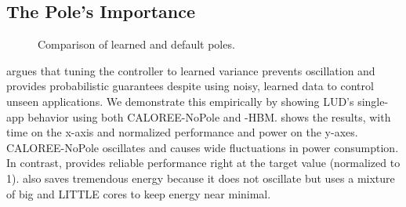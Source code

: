 \subsection{The Pole's Importance}


\begin{figure} 

\caption{Comparison of learned and default poles.}
\label{fig:lavamd-pole}
\end{figure} argues that tuning the
controller to learned variance prevents oscillation and provides
probabilistic guarantees despite using noisy, learned data to control
unseen applications.  We demonstrate this empirically by showing LUD's
single-app behavior using both CALOREE-NoPole and \SYSTEM{}-HBM.
 shows the results, with time on the x-axis
and normalized performance and power on the y-axes.  CALOREE-NoPole
oscillates and causes wide fluctuations in power consumption.  In
contrast, \SYSTEM{} provides reliable performance right at the target
value (normalized to 1).  \SYSTEM{} also saves tremendous energy
because it does not oscillate but uses a mixture of big and LITTLE
cores to keep energy near minimal.

